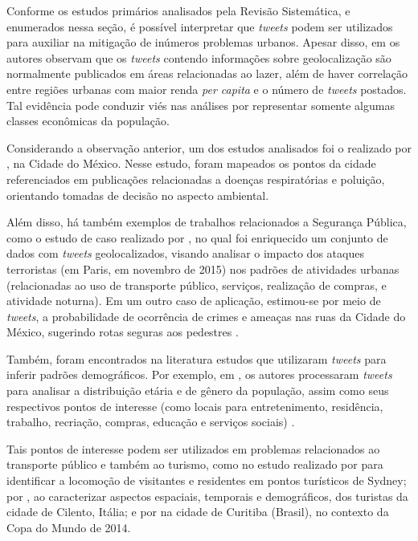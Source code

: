 \documentclass[
	12pt,				%
	oneside,			%
	a4paper,			%
	english,			%
	brazil				%
	]{abntex2ppgsi}
\begin{document}
{{{Conforme os estudos primários analisados pela Revisão Sistemática, e enumerados nessa seção, é possível interpretar que \textit{tweets} podem ser utilizados para auxiliar na mitigação de inúmeros problemas urbanos. Apesar disso, em \cite{Chaniotakis2015} os autores observam que os \textit{tweets} contendo informações sobre geolocalização são normalmente publicados em áreas relacionadas ao lazer, além de haver correlação entre regiões urbanas com maior renda \textit{per capita} e o número de \textit{tweets} postados. Tal evidência pode conduzir viés nas análises por representar somente algumas classes econômicas da população. 

Considerando a observação anterior, um dos estudos analisados foi o realizado por \cite{Zagal2016}, na Cidade do México. Nesse estudo, foram mapeados os pontos da cidade referenciados em publicações relacionadas a doenças respiratórias e poluição, orientando tomadas de decisão no aspecto ambiental. 

Além disso, há também exemplos de trabalhos relacionados a Segurança Pública, como o estudo de caso realizado por \cite{Wen2016}, no qual foi enriquecido um conjunto de dados com \textit{tweets} geolocalizados, visando analisar o impacto dos ataques terroristas (em Paris, em novembro de 2015) nos padrões de atividades urbanas (relacionadas ao uso de transporte público, serviços, realização de compras, e atividade noturna). Em um outro caso de aplicação, estimou-se por meio de \textit{tweets}, a probabilidade de ocorrência de crimes e ameaças nas ruas da Cidade do México, sugerindo rotas seguras aos pedestres \cite{Mata2015}.

Também, foram encontrados na literatura estudos que utilizaram \textit{tweets} para inferir padrões demográficos. Por exemplo, em \cite{Farseev2015, Gkiotsalitis2015, Gkiotsalitis2016}, os autores processaram \textit{tweets} para analisar a distribuição etária e de gênero da população, assim como seus respectivos pontos de interesse (como locais para entretenimento, residência, trabalho, recriação, compras, educação e serviços sociais) \cite{Hasan2014, Maghrebi2015}. 

Tais pontos de interesse podem ser utilizados em problemas relacionados ao transporte público \cite{Gutev2016} e também ao turismo, como no estudo realizado por \cite{Abbasi2015} para identificar a locomoção de visitantes e residentes em pontos turísticos de Sydney; por \cite{Chua2016}, ao caracterizar aspectos espaciais, temporais e demográficos, dos turistas da cidade de Cilento, Itália; e por \cite{Thomaz2016} na cidade de Curitiba (Brasil), no contexto da Copa do Mundo de 2014.

}}}
\end{document}
